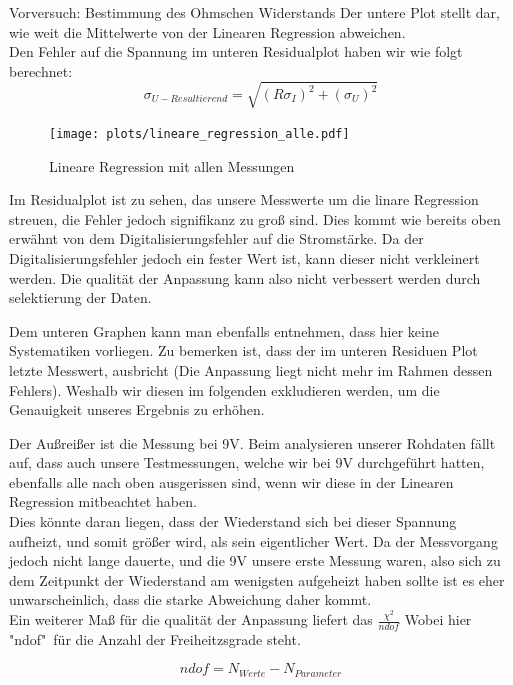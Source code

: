 \documentclass[twoside]{protokoll}
\begin{document}
\begin{aufgabe}{Vorversuch: Bestimmung des Ohmschen Widerstands}
Der untere Plot stellt dar, wie weit die Mittelwerte von der Linearen Regression abweichen. \\

Den Fehler auf die Spannung im unteren Residualplot haben wir wie folgt berechnet:
\begin{equation}
    \sigma_{U-Resultierend} = \sqrt{(R \sigma_I)^2 + (\sigma_U)^2}
\end{equation}

 \begin{figure}[H]
  \centering
  \texttt{[image: plots/lineare\_regression\_alle.pdf]}
  \caption{Lineare Regression mit allen Messungen}
  \centering
  \end{figure}


Im Residualplot ist zu sehen, das unsere Messwerte um die linare Regression streuen, die Fehler jedoch signifikanz zu groß sind. 
Dies kommt wie bereits oben erwähnt von dem Digitalisierungsfehler auf die Stromstärke. 
Da der Digitalisierungsfehler jedoch ein fester Wert ist, kann dieser nicht verkleinert werden. Die qualität der Anpassung kann also nicht verbessert werden durch selektierung der Daten.

Dem unteren Graphen kann man ebenfalls entnehmen, dass hier keine Systematiken vorliegen. 
Zu bemerken ist, dass der im unteren Residuen Plot letzte Messwert, ausbricht (Die Anpassung liegt nicht mehr im Rahmen dessen Fehlers).
Weshalb wir diesen im folgenden exkludieren werden, um die Genauigkeit unseres Ergebnis zu erhöhen.

Der Außreißer ist die Messung bei 9V. Beim analysieren unserer Rohdaten fällt auf, dass auch unsere Testmessungen, welche wir bei 9V durchgeführt hatten, ebenfalls alle  nach oben ausgerissen sind, wenn wir diese in der Linearen Regression mitbeachtet haben.\\
Dies könnte daran liegen, dass der Wiederstand sich bei dieser Spannung aufheizt, und somit größer wird, als sein eigentlicher Wert. 
Da der Messvorgang jedoch nicht lange dauerte, und die 9V unsere erste Messung waren, also sich zu dem Zeitpunkt der Wiederstand am wenigsten aufgeheizt haben sollte ist es eher unwarscheinlich, dass die starke Abweichung daher kommt. \\

Ein weiterer Maß für die qualität der Anpassung liefert das  $\frac{\chi^2}{ndof}$ Wobei hier "ndof"\ für die Anzahl der Freiheitzsgrade steht.

\begin{equation}
ndof = N_{Werte} - N_{Parameter}
\end{equation}


\end{aufgabe}
\end{document}
